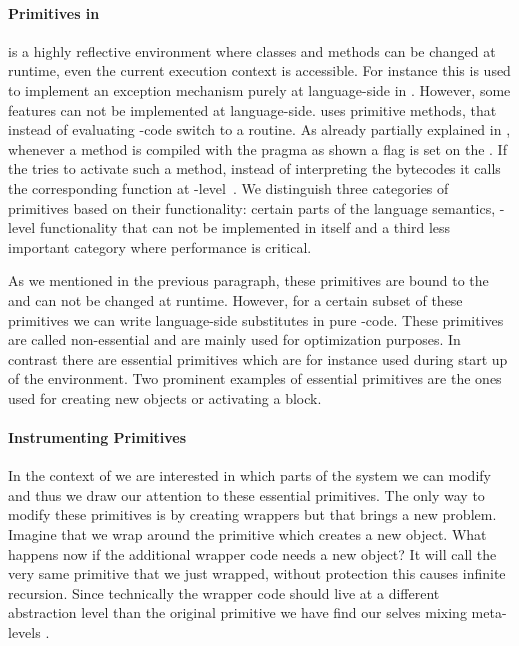 \paragraph{Primitives in \PH}
\PH is a highly reflective environment where classes and methods can be changed at runtime, even the current execution context is accessible.
For instance this is used to implement an exception mechanism purely at language-side in \PH.
However, some features can not be implemented at language-side.
\PH uses primitive methods, that instead of evaluating \PH-code switch to a \VM routine.
As already partially explained in , whenever a method is compiled with the  pragma as shown a flag is set on the . 
If the \VM tries to activate such a method, instead of interpreting the bytecodes it calls the corresponding function at \VM-level~\cite{Gold83a}.
We distinguish three categories of primitives based on their functionality: certain parts of the language semantics, \OS-level functionality that can not be implemented in \PH itself and a third less important category where performance is critical.

As we mentioned in the previous paragraph, these primitives are bound to the \VM and can not be changed at runtime.
However, for a certain subset of these primitives we can write language-side substitutes in pure \PH-code.
These primitives are called non-essential and are mainly used for optimization purposes. 
In contrast there are essential primitives which are for instance used during start up of the \PH environment.
Two prominent examples of essential primitives are the ones used for creating new objects or activating a block.

\paragraph{Instrumenting Primitives}
In the context of \WF we are interested in which parts of the system we can modify and thus we draw our attention to these essential primitives.
The only way to modify these primitives is by creating wrappers but that brings a new problem.
Imagine that we wrap around the primitive which creates a new object.
What happens now if the additional wrapper code needs a new object?
It will call the very same primitive that we just wrapped, without protection this causes infinite recursion.
Since technically the wrapper code should live at a different abstraction level than the original primitive we have find our selves mixing meta-levels \cite{Chib96a}.

